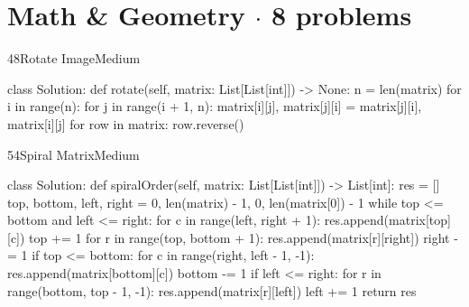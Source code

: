 \section{Math \& Geometry \texorpdfstring{{\normalsize\color{muted}$\cdot$ 8 problems}}{- 8 problems}}

\begin{problem}{48}{Rotate Image}{Medium}
\begin{code}
class Solution:
    def rotate(self, matrix: List[List[int]]) -> None:
        n = len(matrix)
        for i in range(n):
            for j in range(i + 1, n):
                matrix[i][j], matrix[j][i] = matrix[j][i], matrix[i][j]
        for row in matrix:
            row.reverse()
\end{code}
\end{problem}

\begin{problem}{54}{Spiral Matrix}{Medium}
\begin{code}
class Solution:
    def spiralOrder(self, matrix: List[List[int]]) -> List[int]:
        res = []
        top, bottom, left, right = 0, len(matrix) - 1, 0, len(matrix[0]) - 1
        while top <= bottom and left <= right:
            for c in range(left, right + 1): res.append(matrix[top][c])
            top += 1
            for r in range(top, bottom + 1): res.append(matrix[r][right])
            right -= 1
            if top <= bottom:
                for c in range(right, left - 1, -1): res.append(matrix[bottom][c])
                bottom -= 1
            if left <= right:
                for r in range(bottom, top - 1, -1): res.append(matrix[r][left])
                left += 1
        return res
\end{code}
\end{problem}

